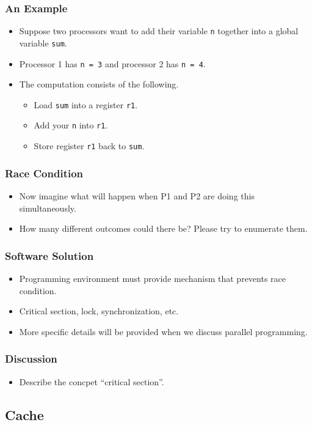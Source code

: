 \documentclass{beamer}
\begin{document}
\begin{CJK}{UTF8}{bsmi}
\begin{frame}
\frametitle{An Example}
\begin{itemize}
\item Suppose two processors want to add their variable {\tt n}
  together into a global variable {\tt sum}.  
\item Processor 1 has {\tt n = 3} and processor 2 has {\tt n = 4}.
\item The computation consists of the following.
  \begin{itemize}
  \item Load {\tt sum} into a register {\tt r1}.
  \item Add your {\tt n} into {\tt r1}.
  \item Store register {\tt r1} back to {\tt sum}.
  \end{itemize}
\end{itemize}
\end{frame}

\begin{frame}
\frametitle{Race Condition}
\begin{itemize}
\item Now imagine what will happen when P1 and P2 are doing this
  simultaneously.
\item How many different outcomes could there be?  Please try to
  enumerate them.
\end{itemize}
\end{frame}

\begin{frame}
\frametitle{Software Solution}
\begin{itemize}
\item Programming environment must provide mechanism that prevents
  race condition.
\item Critical section, lock, synchronization, etc.
\item More specific details will be provided when we discuss parallel
  programming.
\end{itemize}
\end{frame}


\begin{frame}
\frametitle{Discussion}
\begin{itemize}
\item Describe the concpet ``critical section''.
\end{itemize}
\end{frame}


\subsection{Cache}


\end{CJK}
\end{document}
